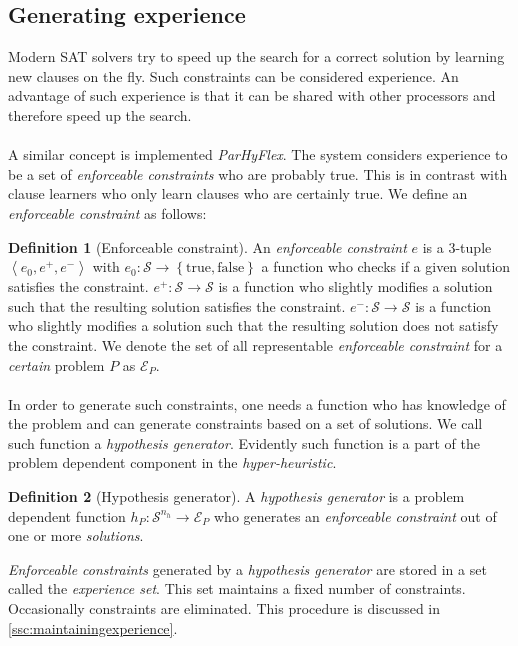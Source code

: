 \documentclass[a4paper,10pt]{article}
\newcommand{\seclab}[1]{\label{sec:#1}}
\newcommand{\sscref}[1]{\ref{ssc:#1}}
\newcommand{\tupl}[1]{\ensuremath{\left\langle #1 \right\rangle}}
\newcommand{\accl}[1]{\ensuremath{\left\{ #1 \right\}}}
\newcommand{\BoolSet}{\accl{\mbox{true},\mbox{false}}}
\newcommand{\calS}{\ensuremath{\mathcal{S}}}
\newcommand{\calE}{\ensuremath{\mathcal{E}}}
\theoremstyle{definition}
\newtheorem{definition}{Definition}
\begin{document}
\subsection{Generating experience}
\seclab{generatingexperience}
Modern SAT solvers try to speed up the search for a correct solution by learning new clauses on the fly. Such constraints can be considered experience. An advantage of such experience is that it can be shared with other processors and therefore speed up the search.

\paragraph{}
A similar concept is implemented \emph{ParHyFlex}. The system considers experience to be a set of \emph{enforceable constraints} who are probably true. This is in contrast with clause learners who only learn clauses who are certainly true. We define an \emph{enforceable constraint} as follows:
\begin{definition}[Enforceable constraint]
An \emph{enforceable constraint} $e$ is a 3-tuple $\tupl{e_0,e^+,e^-}$ with $e_0:\calS\rightarrow\BoolSet$ a function who checks if a given solution satisfies the constraint. $e^+:\calS\rightarrow\calS$ is a function who slightly modifies a solution such that the resulting solution satisfies the constraint. $e^-:\calS\rightarrow\calS$ is a function who slightly modifies a solution such that the resulting solution does not satisfy the constraint. We denote the set of all representable \emph{enforceable constraint} for a \emph{certain} problem $P$ as $\calE_P$.
\end{definition}
\paragraph{}
In order to generate such constraints, one needs a function who has knowledge of the problem and can generate constraints based on a set of solutions. We call such function a \emph{hypothesis generator}. Evidently such function is a part of the problem dependent component in the \emph{hyper-heuristic}.
\begin{definition}[Hypothesis generator]
A \emph{hypothesis generator} is a problem dependent function $h_P:\calS^{n_h}\rightarrow\calE_P$ who generates an \emph{enforceable constraint} out of one or more \emph{solutions}.
\end{definition}
\emph{Enforceable constraints} generated by a \emph{hypothesis generator} are stored in a set called the \emph{experience set}. This set maintains a fixed number of constraints. Occasionally constraints are eliminated. This procedure is discussed in \sscref{maintainingexperience}.
\end{document}
